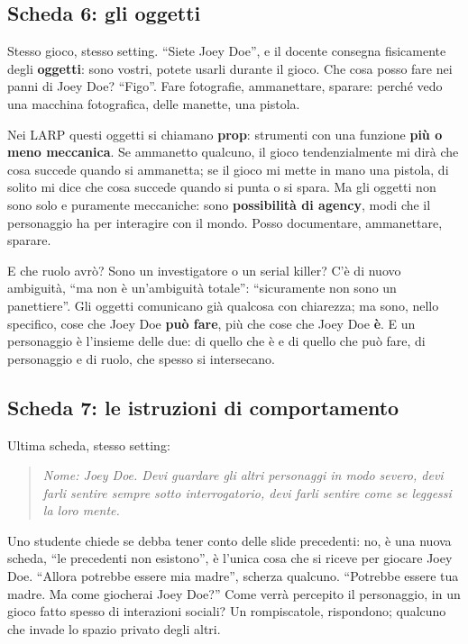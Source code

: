 \subsection{Scheda 6: gli oggetti}



Stesso gioco, stesso setting. ``Siete Joey Doe'', e il docente consegna
fisicamente degli \textbf{oggetti}: sono vostri, potete usarli durante il gioco.
Che cosa posso fare nei panni di Joey Doe? ``Figo''. Fare fotografie, ammanettare,
sparare: perché vedo una macchina fotografica, delle manette, una pistola.

Nei LARP questi oggetti si chiamano \textbf{prop}: strumenti con una funzione
\textbf{più o meno meccanica}. Se ammanetto qualcuno, il gioco tendenzialmente mi
dirà che cosa succede quando si ammanetta; se il gioco mi mette in mano una pistola,
di solito mi dice che cosa succede quando si punta o si spara. Ma gli oggetti non
sono solo e puramente meccaniche: sono \textbf{possibilità di agency}, modi che il
personaggio ha per interagire con il mondo. Posso documentare, ammanettare,
sparare.

E che ruolo avrò? Sono un investigatore o un serial killer? C'è di nuovo
ambiguità, ``ma non è un'ambiguità totale'': ``sicuramente non sono un panettiere''.
Gli oggetti comunicano già qualcosa con chiarezza; ma sono, nello specifico, cose
che Joey Doe \textbf{può fare}, più che cose che Joey Doe \textbf{è}. E un
personaggio è l'insieme delle due: di quello che è e di quello che può fare, di
personaggio e di ruolo, che spesso si intersecano.

\subsection{Scheda 7: le istruzioni di comportamento}

Ultima scheda, stesso setting:
\begin{quote}
\emph{Nome: Joey Doe. Devi guardare gli altri personaggi in modo severo, devi farli
sentire sempre sotto interrogatorio, devi farli sentire come se leggessi la loro
mente.}
\end{quote}
Uno studente chiede se debba tener conto delle slide precedenti: no, è una nuova
scheda, ``le precedenti non esistono'', è l'unica cosa che si riceve per giocare
Joey Doe. ``Allora potrebbe essere mia madre'', scherza qualcuno. ``Potrebbe essere
tua madre. Ma come giocherai Joey Doe?'' Come verrà percepito il personaggio, in
un gioco fatto spesso di interazioni sociali? Un rompiscatole, rispondono; qualcuno
che invade lo spazio privato degli altri.

